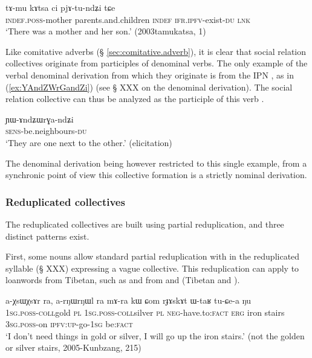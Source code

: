\begin{exe}
\ex \label{ex:tAmu.kAtsa}
\gll
tɤ-mu kɤtsa ci pjɤ-tu-ndʑi tɕe \\
\textsc{indef}.\textsc{poss}-mother  parents.and.children \textsc{indef} \textsc{ifr}.\textsc{ipfv}-exist-\textsc{du} \textsc{lnk} \\
\glt `There was a mother and her son.' (2003tamukatsa, 1)
\end{exe}

Like comitative adverbs (§ \ref{sec:comitative.adverb}), it is clear that social relation collectives originate from participles of denominal verbs. The only example of the verbal denominal  derivation from which they originate is  from the IPN , as in (\ref{ex:YAndZWrGandZi}) (see § XXX on the denominal derivation). The social relation collective  can thus be analyzed as the participle of this verb .  

\begin{exe}
\ex \label{ex:YAndZWrGandZi}
\gll ɲɯ-ɤndʑɯrɣa-ndʑi \\
\textsc{sens}-be.neighbours-\textsc{du} \\
\glt `They are one next to the other.' (elicitation)
\end{exe}

The  denominal derivation being however restricted to this single example, from a synchronic point of view this collective formation is a strictly nominal derivation.

\subsubsection{Reduplicated collectives} \label{sec:redp.coll}
The reduplicated collectives are built using partial reduplication, and three distinct patterns exist.


First, some nouns allow standard partial reduplication with  in the reduplicated syllable (§ XXX) expressing a vague collective. This reduplication can apply to loanwords from Tibetan, such as  and  from  and  (Tibetan  and ).

\begin{exe}
\ex 
\gll a-χsɯ\redp{}χsɤr ra, a-rŋɯ\redp{}rŋɯl ra mɤ-ra kɯ ɕom rɟɤskɤt ɯ-taʁ tu-ɕe-a ŋu \\
\textsc{1sg}.\textsc{poss}-\textsc{coll}\redp{}gold \textsc{pl} \textsc{1sg}.\textsc{poss}-\textsc{coll}\redp{}silver \textsc{pl} \textsc{neg}-have.to:\textsc{fact} \textsc{erg} iron  stairs \textsc{3sg}.\textsc{poss}-on \textsc{ipfv}:\textsc{up}-go-\textsc{1sg} be:\textsc{fact} \\
\glt `I don't need things in gold or silver, I will go up the iron stairs.' (not the golden or silver stairs, 2005-Kunbzang, 215)
\end{exe}

